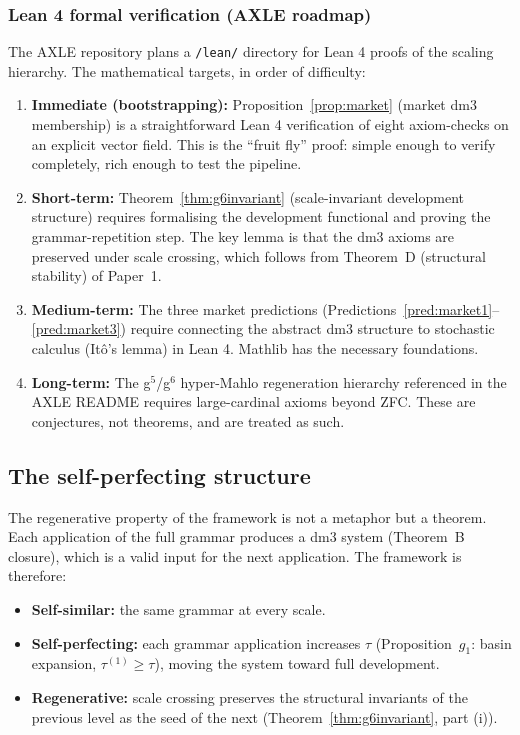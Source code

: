 \subsubsection{Lean 4 formal verification (AXLE roadmap)}

The AXLE repository plans a \texttt{/lean/} directory for
Lean 4 proofs of the scaling hierarchy. The mathematical
targets, in order of difficulty:

\begin{enumerate}[label=(\arabic*)]
  \item \textbf{Immediate (bootstrapping):} Proposition~\ref{prop:market}
    (market dm3 membership) is a straightforward
    Lean 4 verification of eight axiom-checks on an explicit
    vector field. This is the ``fruit fly'' proof: simple
    enough to verify completely, rich enough to test the pipeline.
  \item \textbf{Short-term:} Theorem~\ref{thm:g6invariant}
    (scale-invariant development structure) requires formalising
    the development functional and proving the grammar-repetition
    step. The key lemma is that the dm3 axioms are preserved
    under scale crossing, which follows from Theorem~D
    (structural stability) of Paper~1.
  \item \textbf{Medium-term:} The three market predictions
    (Predictions~\ref{pred:market1}--\ref{pred:market3})
    require connecting the abstract dm3 structure to
    stochastic calculus (It\^{o}'s lemma) in Lean 4.
    Mathlib has the necessary foundations.
  \item \textbf{Long-term:} The g$^5$/g$^6$ hyper-Mahlo
    regeneration hierarchy referenced in the AXLE README
    requires large-cardinal axioms beyond ZFC. These are
    conjectures, not theorems, and are treated as such.
\end{enumerate}

\subsection{The self-perfecting structure}

The regenerative property of the framework is not a metaphor
but a theorem. Each application of the full grammar produces
a dm3 system (Theorem~B closure), which is a valid input for
the next application. The framework is therefore:

\begin{itemize}
  \item \textbf{Self-similar:} the same grammar at every scale.
  \item \textbf{Self-perfecting:} each grammar application
    increases $\tau$ (Proposition~$g_1$: basin expansion,
    $\tau^{(1)} \ge \tau$), moving the system toward full
    development.
  \item \textbf{Regenerative:} scale crossing preserves the
    structural invariants of the previous level as the seed
    of the next (Theorem~\ref{thm:g6invariant}, part (i)).
\end{itemize}

